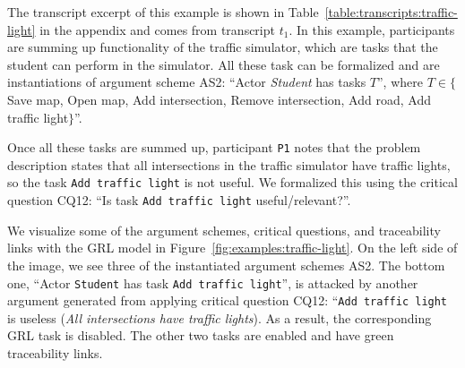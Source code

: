 The transcript excerpt of this example is shown in Table~\ref{table:transcripts:traffic-light} in the appendix and comes from transcript $t_1$. In this example, participants are summing up functionality of the traffic simulator, which are tasks that the student can perform in the simulator. All these task can be formalized and are instantiations of argument scheme AS2: ``Actor \emph{Student} has tasks $T$'', where $T\in\{$Save map, Open map, Add intersection, Remove intersection, Add road, Add traffic light$\}$''. 

Once all these tasks are summed up, participant \texttt{P1} notes that the problem description states that all intersections in the traffic simulator have traffic lights, so the task \texttt{Add traffic light} is not useful. We formalized this using the critical question CQ12: ``Is task \texttt{Add traffic light} useful/relevant?''.

We visualize some of the argument schemes, critical questions, and traceability links with the GRL model in Figure~\ref{fig:examples:traffic-light}. On the left side of the image, we see three of the instantiated argument schemes AS2. The bottom one, ``Actor \texttt{Student} has task \texttt{Add traffic light}'', is attacked by another argument generated from applying critical question CQ12: ``\texttt{Add traffic light} is useless (\emph{All intersections have traffic lights}). As a result, the corresponding GRL task is disabled. The other two tasks are enabled and have green traceability links.

